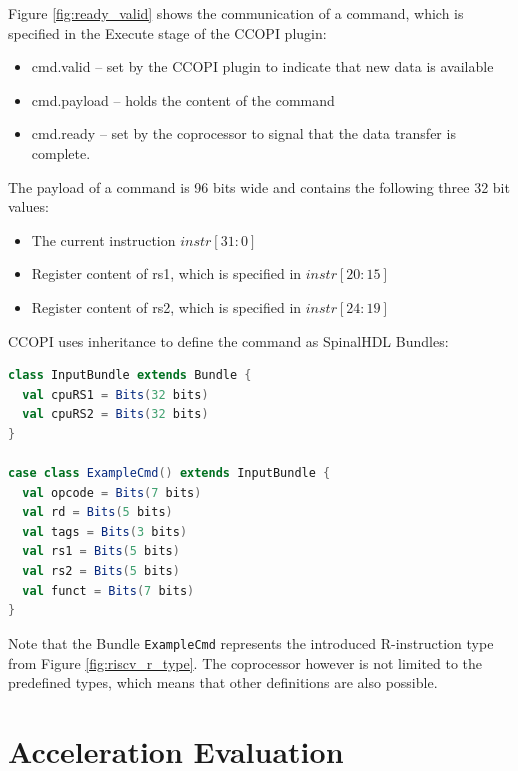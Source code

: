 \documentclass[twoside,twocolumn]{article}
\newcommand{\code}[1]{\texttt{#1}}
\begin{document}
Figure \ref*{fig:ready_valid} shows the communication of a command,
which is specified in the Execute stage of the CCOPI plugin:
\begin{itemize}
    \item cmd.valid -- set by the CCOPI plugin to indicate that new data
        is available
    \item cmd.payload -- holds the content of the command
    \item cmd.ready -- set by the coprocessor to signal that the data
        transfer is complete.
\end{itemize}
The payload of a command is 96 bits wide and contains the following
three 32 bit values:
\begin{itemize}
    \item The current instruction $instr[31:0]$
    \item Register content of rs1, which is specified in $instr[20:15]$
    \item Register content of rs2, which is specified in $instr[24:19]$
\end{itemize}
CCOPI uses inheritance to define the command as SpinalHDL Bundles:
\begin{lstlisting}[language=scala]
class InputBundle extends Bundle {
  val cpuRS1 = Bits(32 bits)
  val cpuRS2 = Bits(32 bits)
}

case class ExampleCmd() extends InputBundle {
  val opcode = Bits(7 bits)
  val rd = Bits(5 bits)
  val tags = Bits(3 bits)
  val rs1 = Bits(5 bits)
  val rs2 = Bits(5 bits)
  val funct = Bits(7 bits)
}
\end{lstlisting}
Note that the Bundle \code{ExampleCmd} represents the introduced R-instruction type from Figure \ref*{fig:riscv_r_type}. The coprocessor
however is not limited to the predefined types, which means
that other definitions are also possible.

\section{Acceleration Evaluation}



\end{document}

